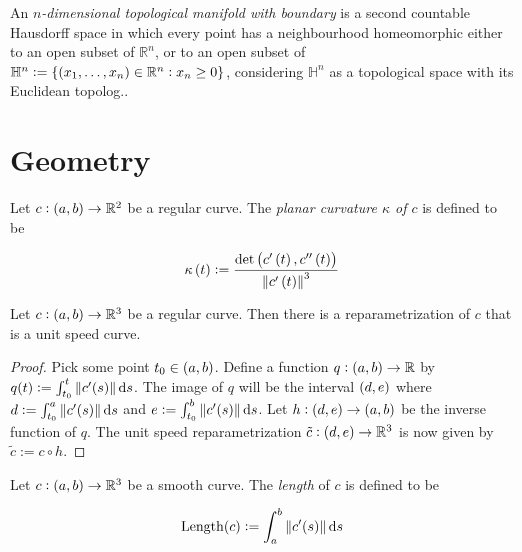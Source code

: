 \vspace{1mm}

\begin{definition}
	An \emph{$n$-dimensional topological manifold with boundary} is a second countable Hausdorff space in which every point has a neighbourhood homeomorphic either to an open subset of $\mathbb{R}^n$, or to an open subset of $\mathbb{H}^n := \cbr[0]{(x_1,\dots,x_n)\in \mathbb{R}^n : x_n \geq 0}$, considering $\mathbb{H}^n$ as a topological space with its Euclidean topolog..
\end{definition}

\section{Geometry}
\begin{definition}
	Let $c: \intoo{a,b} \to \mathbb{R}^2$ be a regular curve. The \emph{planar curvature $\kappa$ of $c$} is defined to be

	\begin{equation}
		\kappa\del{t} := \frac{\det\del{c'\del{t},c''\del{t}}}{\norm[0]{c'\del{t}}^3}	
	\end{equation}
\end{definition}

\vspace{1mm}

\begin{proposition}
	Let $c: \intoo{a,b} \to \mathbb{R}^3$ be a regular curve. Then there is a reparametrization of $c$ that is a unit speed curve.
\end{proposition}

\begin{proof}
	Pick some point $t_0 \in \intoo{a,b}$. Define a function $q: \intoo{a,b} \to \mathbb{R}$ by $q(t) := \int_{t_0}^t \norm[0]{c'(s)} \d s$. The image of $q$ will be the interval $\intoo{d,e}$ where $d := \int_{t_0}^a \norm[0]{c'(s)}\d s$ and $e := \int_{t_0}^b \norm[0]{c'(s)}\d s$. Let $h: \intoo{d,e}\to\intoo{a,b}$ be the inverse function of $q$. The unit speed reparametrization $\tilde{c}: \intoo{d,e}\to \mathbb{R}^3$ is now given by $\tilde{c} := c \circ h$.
\end{proof}

\vspace{1mm}

\begin{definition}
	Let $c: \intoo{a,b} \to \mathbb{R}^3$ be a smooth curve. The \emph{length} of $c$ is defined to be

	\begin{equation}
		\Length(c) := \int_{a}^b \norm[0]{c'(s)} \d s
	\end{equation}
\end{definition}

